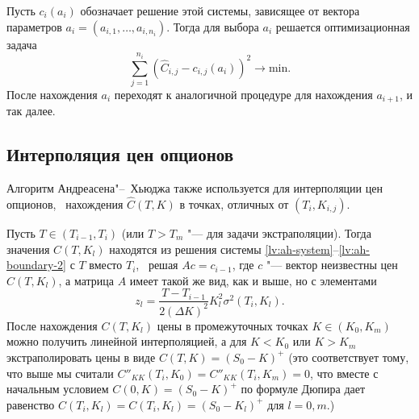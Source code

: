 Пусть $c_i(a_i)$ обозначает решение этой системы, зависящее от вектора параметров $a_i=(a_{i,1},\dots,a_{i,n_i})$. 
Тогда для выбора $a_i$ решается оптимизационная задача
\[
\sum_{j=1}^{n_i} (\hat C_{i,j} - c_{i,j}(a_i))^2 \to \text{min}.
\]
После нахождения $a_i$ переходят к аналогичной процедуре для нахождения $a_{i+1}$, и так далее.


\subsection{Интерполяция цен опционов}
Алгоритм Андреасена"--~Хьюджа также используется для интерполяции цен опционов, \te\ нахождения $\hat C(T,K)$ в точках, отличных от $(T_i,K_{i,j})$.

Пусть $T\in(T_{i-1},T_i)$ (или $T>T_m$ "--- для задачи экстраполяции).
Тогда значения $C(T,K_l)$ находятся из решения системы \eqref{lv:ah-system}--\eqref{lv:ah-boundary-2} с $T$ вместо $T_i$, \te\ решая $Ac = c_{i-1}$, где $c$ "--- вектор неизвестны цен $C(T,K_l)$, а матрица $A$ имеет такой же вид, как и выше, но с элементами
\[
z_l = \frac{T-T_{i-1}}{2(\Delta K)^2} K_l^2\sigma^2(T_i,K_l).
\]
После нахождения $C(T,K_l)$ цены в промежуточных точках $K\in (K_0,K_m)$ можно получить линейной интерполяцией, а для $K< K_0$ или $K>K_m$ экстраполировать цены в виде $C(T,K) = (S_0-K)^+$ (это соответствует тому, что выше мы считали $C''_{KK}(T_i,K_0) = C''_{KK}(T_i,K_m) = 0$, что вместе с начальным условием $C(0,K) = (S_0-K)^+$  по формуле Дюпира дает равенство $C(T_i,K_l) = C(T_i,K_l) = (S_0-K_l)^+$ для $l=0,m$.)




